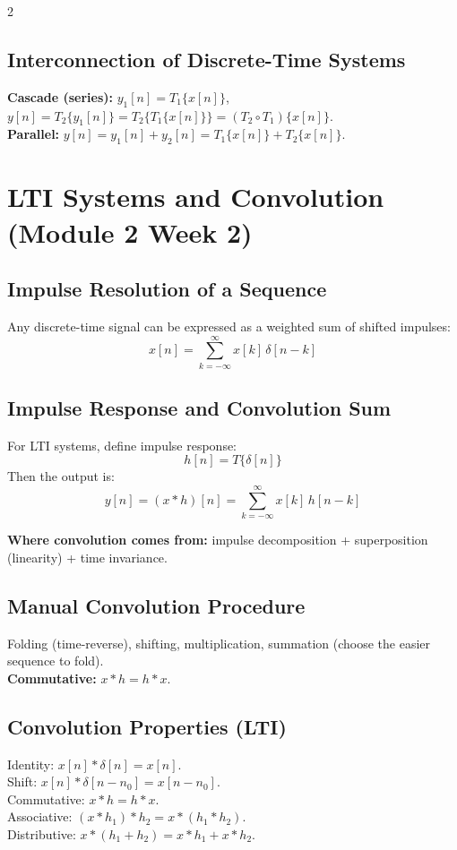 \documentclass[10pt]{article}
\begin{document}
\begin{multicols}{2}
\subsection{Interconnection of Discrete-Time Systems}
\textbf{Cascade (series):} $y_1[n]=T_1\{x[n]\}$, $y[n]=T_2\{y_1[n]\}=T_2\{T_1\{x[n]\}\}=(T_2\circ T_1)\{x[n]\}$.\\
\textbf{Parallel:} $y[n]=y_1[n]+y_2[n]=T_1\{x[n]\}+T_2\{x[n]\}$.

\section{LTI Systems and Convolution (Module 2 Week 2)}

\subsection{Impulse Resolution of a Sequence}
Any discrete-time signal can be expressed as a weighted sum of shifted impulses:
\[
x[n] = \sum_{k=-\infty}^{\infty} x[k]\,\delta[n-k]
\]

\subsection{Impulse Response and Convolution Sum}
For LTI systems, define impulse response:
\[
h[n] = T\{\delta[n]\}
\]
Then the output is:
\[
y[n] = (x*h)[n] = \sum_{k=-\infty}^{\infty} x[k]\,h[n-k]
\]

\textbf{Where convolution comes from:} impulse decomposition + superposition (linearity) + time invariance.

\subsection{Manual Convolution Procedure}
Folding (time-reverse), shifting, multiplication, summation (choose the easier sequence to fold).\\
\textbf{Commutative:} $x*h = h*x$.

\subsection{Convolution Properties (LTI)}
Identity: $x[n]*\delta[n]=x[n]$.\\
Shift: $x[n]*\delta[n-n_0]=x[n-n_0]$.\\
Commutative: $x*h=h*x$.\\
Associative: $(x*h_1)*h_2 = x*(h_1*h_2)$.\\
Distributive: $x*(h_1+h_2) = x*h_1 + x*h_2$.


\end{multicols}
\end{document}
